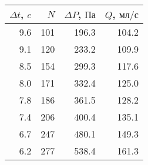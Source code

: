 \begin{tabular}{rrrr}
\toprule
$\Delta t$, $c$ & $N$ & $\Delta P$, $Па$ & $Q$, $мл/с$ \\
\midrule
9.6 & 101 & 196.3 & 104.2 \\
9.1 & 120 & 233.2 & 109.9 \\
8.5 & 154 & 299.3 & 117.6 \\
8.0 & 171 & 332.4 & 125.0 \\
7.8 & 186 & 361.5 & 128.2 \\
7.4 & 206 & 400.4 & 135.1 \\
6.7 & 247 & 480.1 & 149.3 \\
6.2 & 277 & 538.4 & 161.3 \\
\bottomrule
\end{tabular}
